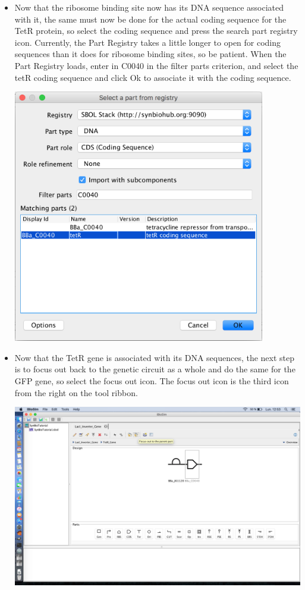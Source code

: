 \documentclass[titlepage,11pt]{article}
\begin{document}
\begin{itemize}
\item Now that the ribosome binding site now has its DNA sequence associated with it, the same must now be done for the actual coding sequence for the TetR protein, so select the coding sequence and press the search part registry icon. Currently, the Part Registry takes a little longer to open for coding sequences than it does for ribosome binding sites, so be patient. When the Part Registry loads, enter in C0040 in the filter parts criterion, and select the tetR coding sequence and click Ok to associate it with the coding sequence.

\begin{center}
\includegraphics[width=110mm]{screenshots/PartCDSTetR}
\end{center}

\item Now that the TetR gene is associated with its DNA sequences, the next step is to focus out back to the genetic circuit as a whole and do the same for the GFP gene, so select the focus out icon. The focus out icon is the third icon from the right on the tool ribbon.

\begin{center}
\includegraphics[width=160mm]{screenshots/PartFocusOut}
\end{center}


\end{itemize}
\end{document}
